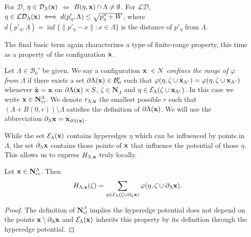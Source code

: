 
\begin{remark}
For $\mathcal D$, $\eta \in \mathcal D_\Lambda({\mathbf{x}})$ $\iff$ $B(\eta,{\mathbf{x}}) \cap \Lambda \neq \emptyset$. \newline
For $\mathcal {LD}$, $\eta \in \mathcal {LD}_\Lambda({\mathbf{x}}) \iff d(p'_\eta,\Lambda) \leq \sqrt{p''_\eta + W}$, where $d(p'_\eta,\Lambda) = \inf\{\|p'_\eta - x\|: x \in \Lambda\}$ is the distance of $p'_\eta$ from $\Lambda$.    \newline
\end{remark}

The final basic term again characterizes a type of finite-range property, this time as a property of the configuration ${\mathbf{x}}$.

\begin{definition}\label{def:cr}
	Let $\Lambda \in \mathcal B_0'$ be given. We say a configuration ${\mathbf{x}}\ \in N$ \textit{confines the range of $\varphi$ from $\Lambda$} if there exists a set $\partial \Lambda({\mathbf{x}}) \in \mathcal B_0'$ such that $\varphi(\eta,\zeta \cup \tilde{{\mathbf{x}}}_{\Lambda^c}) = \varphi(\eta,\zeta\cup{\mathbf{x}}_{\Lambda^c})$ whenever $\tilde{{\mathbf{x}}} = {\mathbf{x}}$ on $\partial \Lambda({\mathbf{x}})\times S$, $\zeta \in \mathbf N_\Lambda$ and $\eta \in \mathcal E_\Lambda(\zeta\cup{\mathbf{x}}_{\Lambda^c})$. In this case we write ${\mathbf{x}} \in \mathbf N^\Lambda_\mathrm{cr}$. We denote $r_{\Lambda,{\mathbf{x}}}$ the smallest possible $r$ such that $(\Lambda + B(0,r))\setminus \Lambda$ satisfies the definition of $\partial \Lambda({\mathbf{x}})$. We will use the abbreviation $\partial_\Lambda {\mathbf{x}} = {\mathbf{x}}_{\partial \Lambda({\mathbf{x}})}$.
\end{definition}

While the set $\mathcal E_\Lambda({\mathbf{x}})$ contains hyperedges $\eta$ which can be influenced by points in $\Lambda$, the set $\partial_\Lambda {\mathbf{x}}$  contains those points of ${\mathbf{x}}$ that influence the potential of those $\eta$. This allows us to express $H_{\Lambda,{\mathbf{x}}}$ truly locally.

\begin{proposition}\label{prop:Hcr}Let ${\mathbf{x}}\in \mathbf N^\Lambda_\mathrm{cr}$. Then 
	$$H_{\Lambda,{\mathbf{x}}}(\zeta) = \sum_{\eta \in \mathcal E_\Lambda(\zeta \cup \partial_\Lambda {\mathbf{x}})} \varphi(\eta, \zeta \cup \partial_\Lambda {\mathbf{x}}).$$
\end{proposition}
\begin{proof} The definition of $\mathbf N^\Lambda_\mathrm{cr}$ implies the hyperedge potential does not depend on the points ${\mathbf{x}} \setminus \partial_\Lambda {\mathbf{x}}$ and $\mathcal E_\Lambda({\mathbf{x}})$ inherits this property by its definition through the hyperedge potential.
\end{proof}



